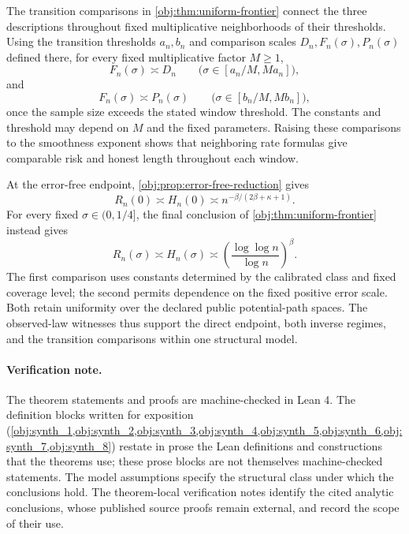 The transition comparisons in \cref{obj:thm:uniform-frontier} connect the three descriptions throughout fixed multiplicative neighborhoods of their thresholds. Using the transition thresholds \(a_n,b_n\) and comparison scales \(D_n,F_n(\sigma),P_n(\sigma)\) defined there, for every fixed multiplicative factor \(M\ge1\),
\[
F_n(\sigma)\asymp D_n
\qquad
\bigl(\sigma\in[a_n/M,Ma_n]\bigr),
\]
and
\[
F_n(\sigma)\asymp P_n(\sigma)
\qquad
\bigl(\sigma\in[b_n/M,Mb_n]\bigr),
\]
once the sample size exceeds the stated window threshold. The constants and threshold may depend on \(M\) and the fixed parameters. Raising these comparisons to the smoothness exponent shows that neighboring rate formulas give comparable risk and honest length throughout each window.

At the error-free endpoint, \cref{obj:prop:error-free-reduction} gives
\[
R_n(0)\asymp H_n(0)\asymp n^{-\beta/(2\beta+\kappa+1)}.
\]
For every fixed \(\sigma\in(0,1/4]\), the final conclusion of \cref{obj:thm:uniform-frontier} instead gives
\[
R_n(\sigma)\asymp H_n(\sigma)
\asymp
\left(\frac{\log\log n}{\log n}\right)^\beta.
\]
The first comparison uses constants determined by the calibrated class and fixed coverage level; the second permits dependence on the fixed positive error scale. Both retain uniformity over the declared public potential-path spaces. The observed-law witnesses thus support the direct endpoint, both inverse regimes, and the transition comparisons within one structural model.

\paragraph{Verification note.}
The theorem statements and proofs are machine-checked in Lean 4. The definition blocks written for exposition (\cref{obj:synth_1,obj:synth_2,obj:synth_3,obj:synth_4,obj:synth_5,obj:synth_6,obj:synth_7,obj:synth_8}) restate in prose the Lean definitions and constructions that the theorems use; these prose blocks are not themselves machine-checked statements. The model assumptions specify the structural class under which the conclusions hold. The theorem-local verification notes identify the cited analytic conclusions, whose published source proofs remain external, and record the scope of their use.
